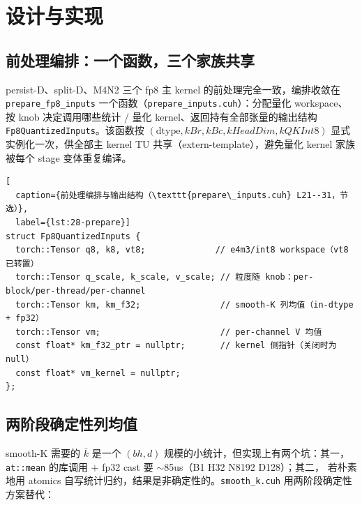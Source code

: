 \section{设计与实现}

\subsection{前处理编排：一个函数，三个家族共享}\label{sec:28-prepare}

persist-D、split-D、M4N2 三个 fp8 主 kernel 的前处理完全一致，编排收敛在
\texttt{prepare\_fp8\_inputs} 一个函数（\texttt{prepare\_inputs.cuh}）：分配量化
workspace、按 knob 决定调用哪些统计 / 量化 kernel、返回持有全部张量的输出结构
\texttt{Fp8QuantizedInputs}。该函数按 $(\text{dtype}, kBr, kBc, kHeadDim,
kQKInt8)$ 显式实例化一次，供全部主 kernel TU 共享（extern-template），避免量化
kernel 家族被每个 stage 变体重复编译。

\begin{lstlisting}[
  caption={前处理编排与输出结构（\texttt{prepare\_inputs.cuh} L21--31，节选）},
  label={lst:28-prepare}]
struct Fp8QuantizedInputs {
  torch::Tensor q8, k8, vt8;              // e4m3/int8 workspace（vt8 已转置）
  torch::Tensor q_scale, k_scale, v_scale; // 粒度随 knob：per-block/per-thread/per-channel
  torch::Tensor km, km_f32;                // smooth-K 列均值（in-dtype + fp32）
  torch::Tensor vm;                        // per-channel V 均值
  const float* km_f32_ptr = nullptr;       // kernel 侧指针（关闭时为 null）
  const float* vm_kernel = nullptr;
};
\end{lstlisting}

\subsection{两阶段确定性列均值}\label{sec:28-kvmean}

smooth-K 需要的 $\bar k$ 是一个 $(bh, d)$ 规模的小统计，但实现上有两个坑：其一，
\texttt{at::mean} 的库调用 + fp32 cast 要 $\sim$85us（B1 H32 N8192 D128）；其二，
若朴素地用 atomics 自写统计归约，结果是非确定性的。\texttt{smooth\_k.cuh} 用两阶段确定性方案替代：

